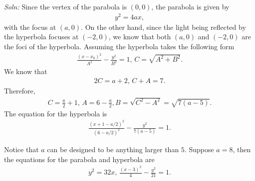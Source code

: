 \documentclass{article}
\begin{document}
\begin{enumerate}
\begin{figure}[ht]
  \end{figure}
  \emph{Soln:} Since the vertex of the parabola is $(0,0)$, the parabola is given by
  \begin{align*}
    y^2 = 4ax,
  \end{align*}
  with the focus at $(a,0)$.
  On the other hand, since the light being reflected by the hyperbola focuses at $(-2,0)$, we know that both $(a,0)$ and $(-2,0)$ are the foci of the hyperbola. Assuming the hyperbola takes the following form
  \begin{align*}
    \frac{(x-x_0)^2}{A^2} - \frac{y^2}{B^2} = 1,\, C =\sqrt{A^2+B^2}.
  \end{align*}
  We know that
  \begin{align*}
    2C = a+2,\,C+A = 7.
  \end{align*}
  Therefore,
  \begin{align*}
    C = \frac{a}{2}+1,\,A = 6-\frac{a}{2}, B = \sqrt{C^2-A^2} = \sqrt{7(a-5)}.
  \end{align*}
  The equation for the hyperbola is
  \begin{align*}
    \frac{(x+1-a/2)^2}{(6-a/2)^2} - \frac{y^2}{7(a-5)} = 1.
  \end{align*}

  Notice that $a$ can be designed to be anything larger than $5$. Suppose $a = 8$, then the equations for the parabola and hyperbola are
\begin{align*}
  y^2 = 32x,\, \frac{(x-3)^2}{4} - \frac{y^2}{21} = 1.
\end{align*}

\end{enumerate}
\end{document}
